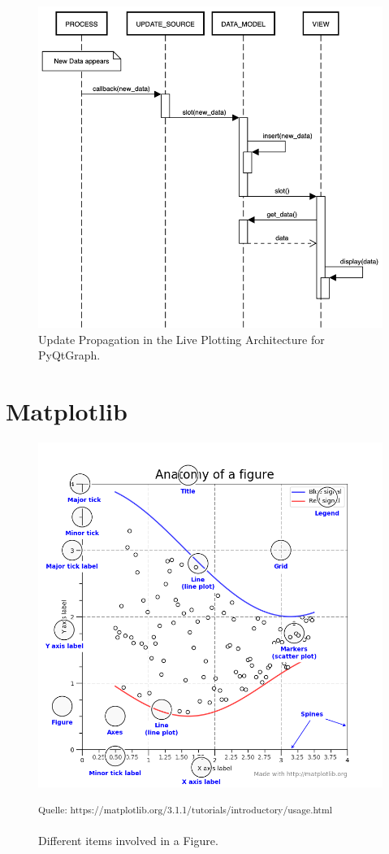 \begin{figure}[h]
    \centering
    \includegraphics[width=12cm]{resources/img/sequence/updateSourceUpdate}
    \caption{ Update Propagation in the Live Plotting Architecture for
        PyQtGraph. }
    \label{a:fig:pyqtgraph:updatesource:update} 
\end{figure}



\clearpage

\section{Matplotlib}
\label{sec:appendix:matplotlib}

\begin{figure}[h]
    \centering
    \includegraphics[width=14cm]{resources/img/MatplotlibContent}
    \caption{Different items involved in a Figure.}
    \small\textsuperscript{Quelle: https://matplotlib.org/3.1.1/tutorials/introductory/usage.html}
    \label{a:fig:matplotlib:content}
\end{figure}

